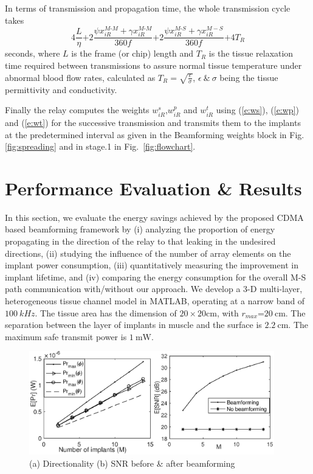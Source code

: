 In terms of transmission and propagation time, the whole transmission cycle takes 
\begin{equation}\label{time}
4\displaystyle \frac{L}{\eta}\text{+} 2\frac{\psi x_{iR}^{M\text{-}M}+\gamma x_{iR}^{M\text{-}M}}{360 f}\text{+} 2\frac{\psi x_{iR}^{M\text{-}S}+\gamma x_{iR}^{M-S}}{360 f}\text{+}4T_R 
\end{equation} seconds, where $L$ is the frame (or chip) length and $T_R$ is the tissue relaxation time required between transmissions to assure normal tissue temperature under abnormal blood flow rates, calculated as $T_R= \sqrt{\frac{\epsilon}{\sigma}}$, $\epsilon\  \& \  \sigma$ being the tissue permittivity and conductivity.  

Finally the relay computes the weights $w^s_{iR}$,$w^p_{iR}$ and $w^t_{iR}$ using (\ref{e:ws}), (\ref{e:wp}) and (\ref{e:wt}) for the successive transmission and transmits them to the implants at the predetermined interval as given in the Beamforming weights block in Fig. \ref{fig:spreading} and in stage.1 in Fig.~\ref{fig:flowchart}.




\section{Performance Evaluation \& Results}\label{sec:results}   

In this section, we evaluate the energy savings achieved by the proposed CDMA based beamforming framework by (i) analyzing the proportion of energy propagating in the direction of the relay to that leaking in the undesired directions, (ii) studying the influence of the number of array elements on the implant power consumption, (iii) quantitatively measuring the improvement in implant lifetime, and (iv) comparing the energy consumption for the overall M-S path communication with/without our approach. We develop a 3-D multi-layer, heterogeneous tissue channel model in MATLAB, operating at a narrow band of $100\ kHz$. The tissue area has the dimension of $20\times 20 \mathrm{cm}$, with $r_{max}$=$20\ \mathrm{cm}$. The separation between the layer of implants in muscle and the surface is $2.2\ \mathrm{cm}$. The maximum safe transmit power is $1\ \mathrm{mW}$.

 \begin{figure}[b]
 \centering
\vspace{-6mm} 
\includegraphics[width=0.95\textwidth]{figures/GC_beamforming/new2plots.eps} 
\vspace{2mm} 
 \caption{\label{fig:prplot} (a) Directionality (b) SNR before \& after beamforming} 
  \end{figure}
  
